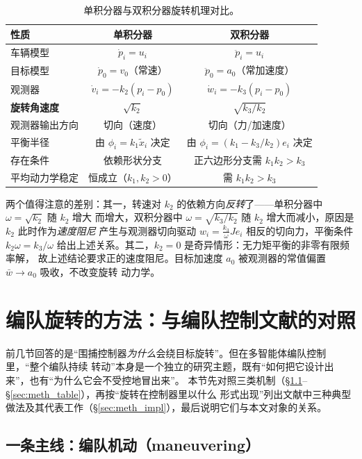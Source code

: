 \documentclass[11pt,a4paper]{ctexart}
\theoremstyle{plain}
\theoremstyle{definition}
\theoremstyle{remark}
\newcommand{\txi}{\tilde{x}}
\begin{document}
\begin{table}[htbp]
\centering
\small
\caption{单积分器与双积分器旋转机理对比。}
\label{tab:cmp}
\begin{tabular}{lcc}
\toprule
性质 & 单积分器 & 双积分器\\
\midrule
车辆模型 & $\dot p_i=u_i$ & $\ddot p_i=u_i$\\
目标模型 & $\dot p_0=v_0$（常速） & $\ddot p_0=a_0$（常加速度）\\
观测器 & $\dot v_i=-k_2(p_i-p_0)$ & $\dot w_i=-k_3(p_i-p_0)$\\
\textbf{旋转角速度} & $\sqrt{k_2}$ & $\sqrt{k_3/k_2}$\\
观测器输出方向 & 切向（速度） & 切向（力/加速度）\\
平衡半径 & 由 $\phi_i=k_1\txi_i$ 决定 & 由 $\phi_i=(k_1-k_3/k_2)e_i$ 决定\\
存在条件 & 依赖形状分支 & 正六边形分支需 $k_1k_2>k_3$\\
平均动力学稳定 & 恒成立（$k_1,k_2>0$） & 需 $k_1k_2>k_3$\\
\bottomrule
\end{tabular}
\end{table}

两个值得注意的差别：其一，转速对 $k_2$ 的依赖方向\emph{反转}了——单积分器中 $\omega=\sqrt{k_2}$ 随 $k_2$ 增大
而增大，双积分器中 $\omega=\sqrt{k_3/k_2}$ 随 $k_2$ 增大而减小，原因是 $k_2$ 此时作为\emph{速度阻尼}
产生与观测器切向驱动 $w_i=\frac{k_3}{\omega}Je_i$ 相反的切向力，平衡条件
$k_2\omega=k_3/\omega$ 给出上述关系。其二，$k_2=0$ 是奇异情形：无力矩平衡的非零有限频率解，
故上述结论要求正的速度阻尼。目标加速度 $a_0$ 被观测器的常值偏置 $\bar w\to a_0$ 吸收，不改变旋转
动力学。

\section{编队旋转的方法：与编队控制文献的对照}
\label{sec:methods}

前几节回答的是“围捕控制器\emph{为什么}会绕目标旋转”。但在多智能体编队控制里，“整个编队持续
转动”本身是一个独立的研究主题，既有“如何把它设计出来”，也有“为什么它会不受控地冒出来”。
本节先对照三类机制（\S\ref{sec:meth_maneuver}--\S\ref{sec:meth_table}），再按“旋转在控制器里以什么
形式出现”列出文献中三种典型做法及其代表工作（\S\ref{sec:meth_impl}），最后说明它们与本文对象的关系。

\subsection{一条主线：编队机动（maneuvering）}
\label{sec:meth_maneuver}
\end{document}
